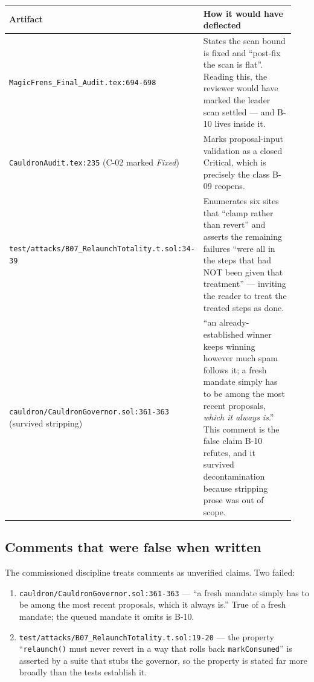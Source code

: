 \documentclass[11pt,a4paper]{article}
\newcommand{\code}[1]{\texttt{\small #1}}
\newcommand{\fileref}[1]{\texttt{\scriptsize #1}}
\begin{document}
\begin{longtable}{@{}p{0.42\linewidth}p{0.52\linewidth}@{}}
\toprule
\textbf{Artifact} & \textbf{How it would have deflected} \\
\midrule
\endhead
\fileref{MagicFrens\_Final\_Audit.tex:694-698} &
  States the scan bound is fixed and ``post-fix the scan is flat''. Reading this, the
  reviewer would have marked the leader scan settled --- and B-10 lives inside it. \\
\fileref{CauldronAudit.tex:235} (C-02 marked \emph{Fixed}) &
  Marks proposal-input validation as a closed Critical, which is precisely the class B-09
  reopens. \\
\fileref{test/attacks/B07\_RelaunchTotality.t.sol:34-39} &
  Enumerates six sites that ``clamp rather than revert'' and asserts the remaining failures
  ``were all in the steps that had NOT been given that treatment'' --- inviting the reader
  to treat the treated steps as done. \\
\fileref{cauldron/CauldronGovernor.sol:361-363} (survived stripping) &
  ``an already-established winner keeps winning however much spam follows it; a fresh
  mandate simply has to be among the most recent proposals, \emph{which it always is}.''
  This comment is the false claim B-10 refutes, and it survived decontamination because
  stripping prose was out of scope. \\
\bottomrule
\end{longtable}

\subsection{Comments that were false when written}

The commissioned discipline treats comments as unverified claims. Two failed:

\begin{enumerate}
\item \fileref{cauldron/CauldronGovernor.sol:361-363} --- ``a fresh mandate simply has to
      be among the most recent proposals, which it always is.'' True of a fresh mandate;
      the queued mandate it omits is B-10.
\item \fileref{test/attacks/B07\_RelaunchTotality.t.sol:19-20} --- the property
      ``\code{relaunch()} must never revert in a way that rolls back \code{markConsumed}''
      is asserted by a suite that stubs the governor, so the property is stated far more
      broadly than the tests establish it.
\end{enumerate}
\end{document}
